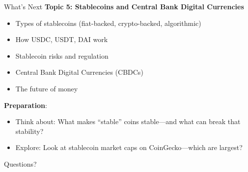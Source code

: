 \documentclass[10pt]{beamer}
\begin{document}
\begin{frame}{What's Next}
  \textbf{Topic 5: Stablecoins and Central Bank Digital Currencies}
  \begin{itemize}
    \item Types of stablecoins (fiat-backed, crypto-backed, algorithmic)
    \item How USDC, USDT, DAI work
    \item Stablecoin risks and regulation
    \item Central Bank Digital Currencies (CBDCs)
    \item The future of money
  \end{itemize}
  
  \vspace{1em}
  \textbf{Preparation}:
  \begin{itemize}
    \item Think about: What makes ``stable'' coins stable---and what can break that stability?
    \item Explore: Look at stablecoin market caps on CoinGecko---which are largest?
  \end{itemize}
\end{frame}

\begin{frame}[plain]
  \vfill
  \begin{center}
    {\Large Questions?}
  \end{center}
  \vfill
\end{frame}
\end{document}

